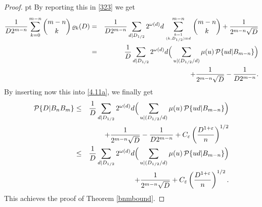 \documentclass[10pt,a4paper]{amsart}
\def\P{{\mathcal P}}
\def \e{{\varepsilon}}
\def \m{{\mu}}
\def \o{{\omega}}
\begin{document}
\begin{proof}
 pt
By reporting this in \eqref{323} we get
\begin{eqnarray}\label{323a} 
 {1\over D2^{ m-n }  } \sum_{k=0}^{m-n}  {{m-n}\choose {k}} \, \varrho_k(D) 
 & =  & {1  \over D 2^{  m-n }}\sum_{d| D_{1/2}} 2^{\o (d)}d
 \sum_{k=1\atop (k, D_{1/2})=d}^{m-n}   {{m-n}\choose {k}}  +{1\over 2^{  m-n }\sqrt D }
\cr & =  &  {1  \over D }\sum_{d| D_{1/2} } 2^{\o (d)}d
 \Big(\sum_{u|  (D_{1/2}/d )}\m(u)\, \P\{ud|B_{m-n}\}\Big)
 \cr & &  +{1\over 2^{  m-n }\sqrt D }-{1  \over  D2^{  m-n }} 
   .\end{eqnarray}
By inserting now this into  \eqref{4.11a}, we finally get
\begin{eqnarray}\label{4.11b}  \P \{ D|B_nB_m \} 
&\le &{1  \over D }\sum_{d| D_{1/2} } 2^{\o (d)}d
 \Big(\sum_{u|  (D_{1/2}/d )}\m(u)\, \P\{ud|B_{m-n}\}\Big)
\cr &  &   +{1\over 2^{  m-n }\sqrt D }-{1  \over D 2^{  m-n }}+C_\e
\left({     D  ^{1 + \e}\over   n }\right)^{1/2 }
\cr &\le &{1  \over D }\sum_{d| D_{1/2} } 2^{\o (d)}d
 \Big(\sum_{u|  (D_{1/2}/d )}\m(u)\, \P\{ud|B_{m-n}\}\Big)
\cr &  &   +{1\over 2^{  m-n }\sqrt D } +C_\e
\left({     D  ^{1 + \e}\over   n }\right)^{1/2 }. 
\end{eqnarray} 
This achieves the proof of Theorem \ref{bnmbound}.
\end{proof}
\end{document}

